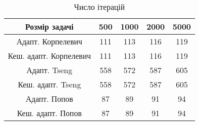 \begin{table}[H]
	\centering
	\begin{tabular}{|c||c|c|c|c|}\hline
		Розмір задачі & 500 & 1000 & 2000 & 5000 \\ \hline \hline
		Адапт. Корпелевич & 111 & 113 & 116 & 119 \\ \hline
		Кеш. адапт. Корпелевич & 111 & 113 & 116 & 119 \\ \hline
		Адапт. Tseng & 558 & 572 & 587 & 605 \\ \hline
		Кеш. адапт. Tseng & 558 & 572 & 587 & 605 \\ \hline
		Адапт. Попов & 87 & 89 & 91 & 94 \\ \hline
		Кеш. адапт. Попов & 87 & 89 & 91 & 94 \\ \hline
	\end{tabular}
	\caption{Число ітерацій}
\end{table}
